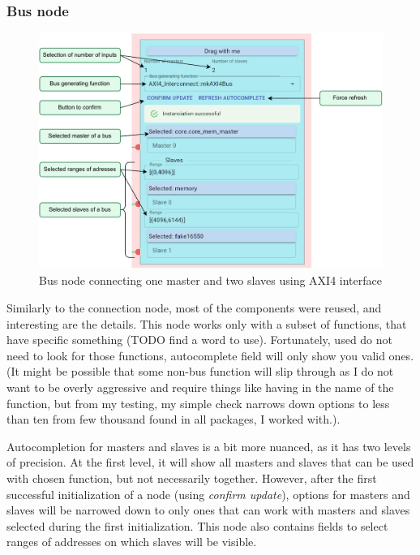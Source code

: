 \documentclass[12pt]{report}
\begin{document}
\subsubsection{Bus node}
\label{sec:AutocompletionBusNode}
\begin{figure}[!h]
\centering
\includegraphics[width=1\columnwidth]{pdfExports/LargeMap-BusNode.drawio.pdf}
\caption{Bus node connecting one master and two slaves using AXI4 interface}
\end{figure}

Similarly to the connection node, most of the components were reused, and interesting are the details. This node works only with a subset of functions, that have specific something (TODO find a word to use). Fortunately, used do not need to look for those functions, autocomplete field will only show you valid ones. (It might be possible that some non-bus function will slip through as I do not want to be overly aggressive and require things like having  in the name of the function, but from my testing, my simple check narrows down options to less than ten from few thousand found in all packages, I worked with.).

Autocompletion for masters and slaves is a bit more nuanced, as it has two levels of precision. At the first level, it will show all masters and slaves that can be used with chosen function, but not necessarily together. However, after the first successful initialization of a node (using \emph{confirm update}), options for masters and slaves will be narrowed down to only ones that can work with masters and slaves selected during the first initialization.
This node also contains fields to select ranges of addresses on which slaves will be visible. 
\newpage
\end{document}
